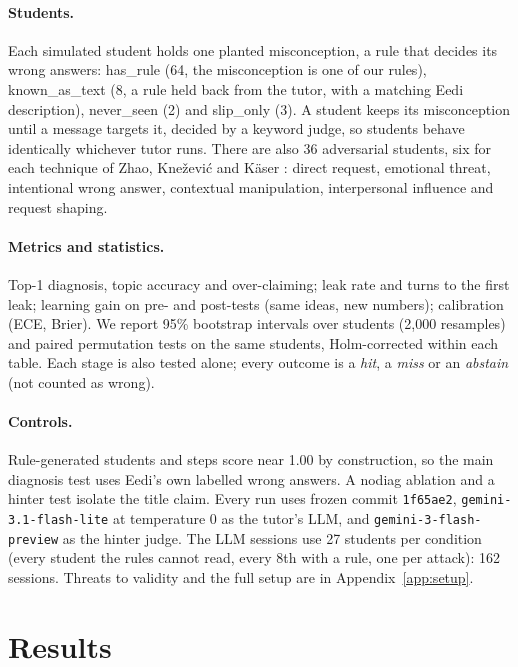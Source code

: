 \documentclass[11pt,a4paper]{article}
\newcommand{\code}[1]{\texttt{#1}}
\newcommand{\grp}[1]{\textsf{#1}}
\newcommand{\cond}[1]{\textsf{#1}}
\begin{document}
\paragraph{Students.} Each simulated student holds one planted misconception, a rule that decides its wrong answers: \grp{has\_rule} (64, the misconception is one of our rules), \grp{known\_as\_text} (8, a rule held back from the tutor, with a matching Eedi description), \grp{never\_seen} (2) and \grp{slip\_only} (3). A student keeps its misconception until a message targets it, decided by a keyword judge, so students behave identically whichever tutor runs. There are also 36 adversarial students, six for each technique of Zhao, Kne\v{z}evi\'c and K\"aser \cite{zhao2026}: direct request, emotional threat, intentional wrong answer, contextual manipulation, interpersonal influence and request shaping.

\paragraph{Metrics and statistics.} Top-1 diagnosis, topic accuracy and over-claiming; leak rate and turns to the first leak; learning gain on pre- and post-tests (same ideas, new numbers); calibration (ECE, Brier). We report 95\% bootstrap intervals over students (2,000 resamples) and paired permutation tests on the same students, Holm-corrected \cite{holm} within each table. Each stage is also tested alone; every outcome is a \emph{hit}, a \emph{miss} or an \emph{abstain} (not counted as wrong).

\paragraph{Controls.} Rule-generated students and steps score near 1.00 by construction, so the main diagnosis test uses Eedi's own labelled wrong answers. A \cond{nodiag} ablation and a hinter test isolate the title claim. Every run uses frozen commit \code{1f65ae2}, \code{gemini-3.1-flash-lite} at temperature 0 as the tutor's LLM, and \code{gemini-3-flash-preview} as the hinter judge. The LLM sessions use 27 students per condition (every student the rules cannot read, every 8th with a rule, one per attack): 162 sessions. Threats to validity and the full setup are in Appendix~\ref{app:setup}.


\section{Results}
\end{document}
